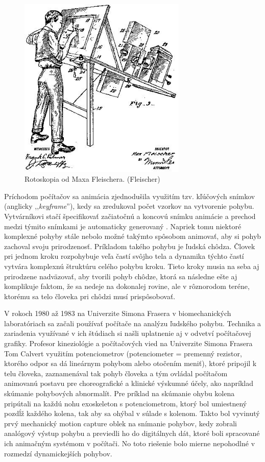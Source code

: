 \begin{figure}[!htbp]
  \centering
  \includegraphics[width=8cm]{img/Rotoscoping-by-Max-Fleischer-Fleischer.png}
  \caption{Rotoskopia od Maxa Fleischera. (Fleischer)}
  \label{rotoscopeFig}
\end{figure}

Príchodom počítačov sa animácia zjednodušila využitím tzv. kľúčových snímkov (anglicky ,,\textit{keyframe}''), kedy sa zredukoval počet vzorkov na vytvorenie pohybu. Vytvárníkovi stačí špecifikovať začiatočnú a koncovú snímku animácie a prechod medzi týmito snímkami je automaticky generovaný \cite{mocapFundamentals}. Napriek tomu niektoré komplexné pohyby stále nebolo možné takýmto spôsobom animovať, aby si pohyb zachoval svoju prirodzenosť. 
Príkladom takého pohybu je ľudská chôdza. Človek pri jednom kroku rozpohybuje veľa častí svôjho tela a dynamika týchto častí vytvára komplexnú štruktúru celého pohybu kroku. Tieto kroky musia na seba aj prirodzene nadväzovať, aby tvorili pohyb chôdze, ktorá sa následne ešte aj komplikuje faktom, že sa nedeje na dokonalej rovine, ale v rôznorodom teréne, ktorému sa telo človeka pri chôdzi musí prispôsobovať.

V rokoch 1980 až 1983 na Univerzite Simona Frasera v biomechanických laboratóriach sa začali používať počítače na analýzu ľudského pohybu. Technika a zariadenia využívané v ich štúdiach si našli uplatnenie aj v odvetví počítačovej grafiky. Profesor kineziológie a počítačových vied na Univerzite Simona Frasera Tom Calvert využitím potenciometrov (potenciometer = premenný rezistor, ktorého odpor sa dá lineárnym pohybom alebo otočením meniť), ktoré pripojil k telu človeka, zaznamenával tak pohyb človeka a tým ovládal počítačom animovanú postavu pre choreografické a klinické výskumné účely, ako napríklad skúmanie pohybových abnormalít. Pre príklad na skúmanie ohybu kolena pripútali na každú nohu exoskeleton s potenciometrom, ktorý bol umiestnený pozdĺž každého kolena, tak aby sa ohýbal v súlade s kolenom. Takto bol vyvinutý prvý mechanický motion capture oblek na snímanie pohybov, kedy zobrali analógový výstup pohybu a previedli ho do digitálnych dát, ktoré boli spracované ich animačným systémom v počítači. No toto riešenie bolo mierne nepohodlné v rozmedzí dynamickejších pohybov.

